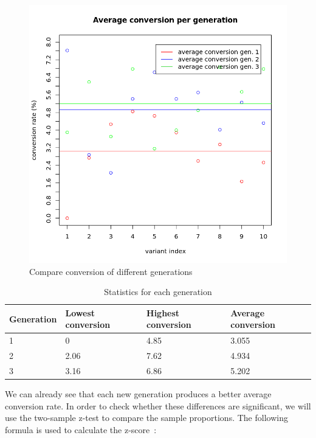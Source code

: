 \documentclass{report}
\begin{document}
\begin{figure}[ht]
	\centering
	\includegraphics[width=0.8\linewidth]{imgs/comparegen.png}
	\caption{Compare conversion of different generations}
	\label{fig:comparegen}
\end{figure}
\FloatBarrier
\begin{table}[h]
 \begin{tabular}{|p{2cm}|p{3.5cm}|p{3.5cm}|p{3.5cm}|}
    \hline
\textbf{Generation} & \textbf{Lowest conversion} & \textbf{Highest conversion} & \textbf{Average conversion} \\ \hline
    1          & 0                 & 4.85               & 3.055                                                     \\\hline
    2          & 2.06              & 7.62               & 4.934                                                     \\\hline
    3          & 3.16              & 6.86               & 5.202                                                     \\\hline

	\end{tabular}
	\caption {Statistics for each generation}
	
	\label{tab:infogen}
\end{table}

We can already see that each new generation produces a better average conversion rate. In order to check whether these differences are significant, we will use the two-sample z-test to compare the sample proportions. The following formula is used to calculate the z-score~\cite{brown2001interval}:
\end{document}
